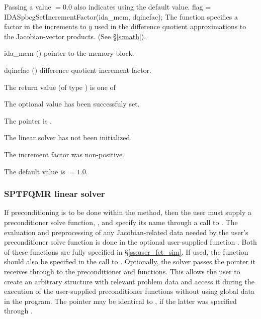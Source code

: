 {{  Passing a value $ = 0.0$ also indicates using the default value.
}
{
  flag = IDASpbcgSetIncrementFactor(ida\_mem, dqincfac);
}
{
  The function  specifies a factor in the 
  increments to $y$ used in the difference quotient approximations 
  to the Jacobian-vector products.  (See \S\ref{s:math}).
}
{
  \begin{args}[dqincfac]
  \item[ida\_mem] ()
    pointer to the {\ida} memory block.
  \item[dqincfac] ()
    difference quotient increment factor.
  \end{args}
}
{
  The return value  (of type ) is one of
  \begin{args}
  \item[\Id{IDASPBCG\_SUCCESS}] 
    The optional value has been successfuly set.
  \item[\Id{IDASPBCG\_MEM\_NULL}]
    The  pointer is .
  \item[\Id{IDASPBCG\_LMEM\_NULL}]
    The {\idaspbcg} linear solver has not been initialized.
  \item[\Id{IDASPBCG\_ILL\_INPUT}]
    The increment factor was non-positive.
  \end{args}
}
{
  The default value is  $=1.0$.
}
\subsubsection{SPTFQMR linear solver}\label{sss:optin_sptfqmr}
If preconditioning is to be done within the {\sptfqmr} method, then the user
must supply a preconditioner solve function, , and specify its
name through a call to .
The evaluation and preprocessing of any Jacobian-related data needed
by the user's preconditioner solve function is done in the optional
user-supplied function . Both of these functions are
fully specified in \S\ref{ss:user_fct_sim}.
If used, the  function should also be specified in the call to
.
Optionally, the {\idasptfqmr} solver passes the pointer  it receives
through  to the preconditioner  and
 functions.  
This allows the user to create an arbitrary structure with relevant problem data 
and access it during the execution of the user-supplied preconditioner functions
without using global data in the program.  
The pointer  may be identical to , if the latter was 
specified through .

}
